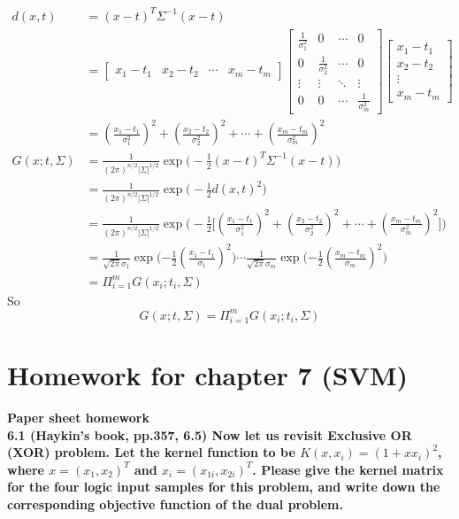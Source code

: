 \noindent
\begin{align}
d(x,t)&= (x-t)^T\Sigma^{-1}(x-t)\nonumber \\
&=\begin{bmatrix}
    x_1-t_1 & x_2-t_2 & \cdots & x_m-t_m
  \end{bmatrix}\begin{bmatrix}
                                     \frac{1}{\sigma_1^2} & 0 & \cdots & 0 \\
                                     0& \frac{1}{\sigma_2^2} & \cdots & 0 \\
                                     \vdots & \vdots & \ddots & \vdots \\
                                     0 & 0 & \cdots & \frac{1}{\sigma_m^2}
                                   \end{bmatrix}\begin{bmatrix}
                                                  x_1-t_1 \\
                                                  x_2-t_2 \\
                                                  \vdots \\
                                                  x_m-t_m
                                                \end{bmatrix}\nonumber\\
&=(\frac{x_1-t_1}{\sigma_1^2})^2+(\frac{x_2-t_2}{\sigma_2^2})^2+\cdots+(\frac{x_m-t_m}{\sigma_m^2})^2\nonumber\\
G(x;t,\Sigma)&=\frac{1}{(2\pi)^{n/2}|\Sigma|^{1/2}}\exp\Big(-\frac{1}{2}(x-t)^T\Sigma^{-1}(x-t)\Big)\nonumber\\
&=\frac{1}{(2\pi)^{n/2}|\Sigma|^{1/2}}\exp\Big(-\frac{1}{2}d(x,t)^2\Big)\nonumber\\
&=\frac{1}{(2\pi)^{n/2}|\Sigma|^{1/2}}\exp\Big(-\frac{1}{2}\big[(\frac{x_1-t_1}{\sigma_1^2})^2+(\frac{x_2-t_2}{\sigma_2^2})^2+\cdots+(\frac{x_m-t_m}{\sigma_m^2})^2\big]\Big)\nonumber\\
&=\frac{1}{\sqrt{2\pi}\sigma_1}\exp\Big({-\frac{1}{2}(\frac{x_1-t_1}{\sigma_1})^2}\Big)\cdots\frac{1}{\sqrt{2\pi}\sigma_m}\exp\Big({-\frac{1}{2}(\frac{x_m-t_m}{\sigma_m})^2}\Big)\nonumber\\
&=\Pi_{i=1}^mG(x_i;t_i,\Sigma)\nonumber
\end{align}
So$$G(x;t,\Sigma)=\Pi_{i=1}^mG(x_i;t_i,\Sigma)$$



\newpage
\section{Homework for chapter 7 (SVM)}
\noindent\textbf{Paper sheet homework}\\
\noindent \textbf{6.1 (Haykin’s book, pp.357, 6.5) Now let us revisit Exclusive OR (XOR) problem. Let the kernel
function to be $K(x,x_i)=(1+xx_i)^2$, where $x=(x_1,x_2)^T$ and $x_i=(x_{1i},x_{2i})^T$. Please give the kernel
matrix for the four logic input samples for this problem, and write down the corresponding objective
function of the dual problem.}

